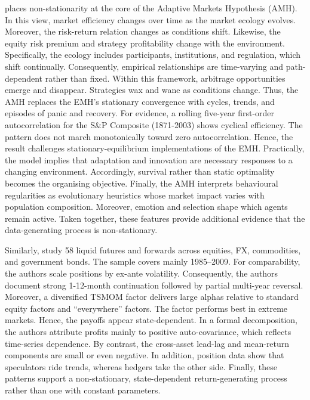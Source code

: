 \cite{Lo} places non-stationarity at the core of the Adaptive Markets Hypothesis (AMH). In this view, market efficiency changes over time as the market ecology evolves. Moreover, the risk-return relation changes as conditions shift. Likewise, the equity risk premium and strategy profitability change with the environment. Specifically, the ecology includes participants, institutions, and regulation, which shift continually. Consequently, empirical relationships are time-varying and path-dependent rather than fixed. Within this framework, arbitrage opportunities emerge and disappear. Strategies wax and wane as conditions change. Thus, the AMH replaces the EMH's stationary convergence with cycles, trends, and episodes of panic and recovery. For evidence, a rolling five-year first-order autocorrelation for the S\&P Composite (1871-2003) shows cyclical efficiency. The pattern does not march monotonically toward zero autocorrelation. Hence, the result challenges stationary-equilibrium implementations of the EMH. Practically, the model implies that adaptation and innovation are necessary responses to a changing environment. Accordingly, survival rather than static optimality becomes the organising objective. Finally, the AMH interprets behavioural regularities as evolutionary heuristics whose market impact varies with population composition. Moreover, emotion and selection shape which agents remain active. Taken together, these features provide additional evidence that the data-generating process is non-stationary.


Similarly, \cite{MOSKOWITZ2012228} study 58 liquid futures and forwards across equities, FX, commodities, and government bonds. The sample covers mainly 1985–2009. For comparability, the authors scale positions by ex-ante volatility. Consequently, the authors document strong 1-12-month continuation followed by partial multi-year reversal. Moreover, a diversified TSMOM factor delivers large alphas relative to standard equity factors and ``everywhere'' factors. The factor performs best in extreme markets. Hence, the payoffs appear state-dependent. In a formal decomposition, the authors attribute profits mainly to positive auto-covariance, which reflects time-series dependence. By contrast, the cross-asset lead-lag and mean-return components are small or even negative. In addition, position data show that speculators ride trends, whereas hedgers take the other side. Finally, these patterns support a non-stationary, state-dependent return-generating process rather than one with constant parameters.


